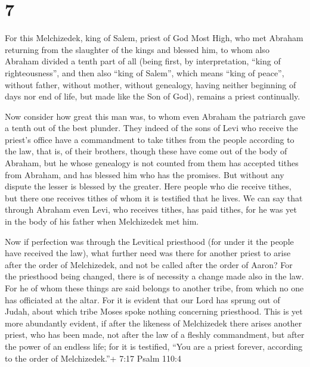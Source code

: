 \hypertarget{section-6}{%
\section{7}\label{section-6}}

 For this Melchizedek, king of Salem, priest of God Most
High, who met Abraham returning from the slaughter of the kings and
blessed him,  to whom also Abraham divided a tenth part of
all (being first, by interpretation, ``king of righteousness'', and then
also ``king of Salem'', which means ``king of peace'', 
without father, without mother, without genealogy, having neither
beginning of days nor end of life, but made like the Son of God),
remains a priest continually.

 Now consider how great this man was, to whom even Abraham
the patriarch gave a tenth out of the best plunder.  They
indeed of the sons of Levi who receive the priest's office have a
commandment to take tithes from the people according to the law, that
is, of their brothers, though these have come out of the body of
Abraham,  but he whose genealogy is not counted from them
has accepted tithes from Abraham, and has blessed him who has the
promises.  But without any dispute the lesser is blessed by
the greater.  Here people who die receive tithes, but there
one receives tithes of whom it is testified that he lives. 
We can say that through Abraham even Levi, who receives tithes, has paid
tithes,  for he was yet in the body of his father when
Melchizedek met him.

 Now if perfection was through the Levitical priesthood
(for under it the people have received the law), what further need was
there for another priest to arise after the order of Melchizedek, and
not be called after the order of Aaron?  For the priesthood
being changed, there is of necessity a change made also in the law.
 For he of whom these things are said belongs to another
tribe, from which no one has officiated at the altar.  For
it is evident that our Lord has sprung out of Judah, about which tribe
Moses spoke nothing concerning priesthood.  This is yet
more abundantly evident, if after the likeness of Melchizedek there
arises another priest,  who has been made, not after the
law of a fleshly commandment, but after the power of an endless life;
 for it is testified, ``You are a priest forever, according
to the order of Melchizedek.''+ 7:17 Psalm 110:4

